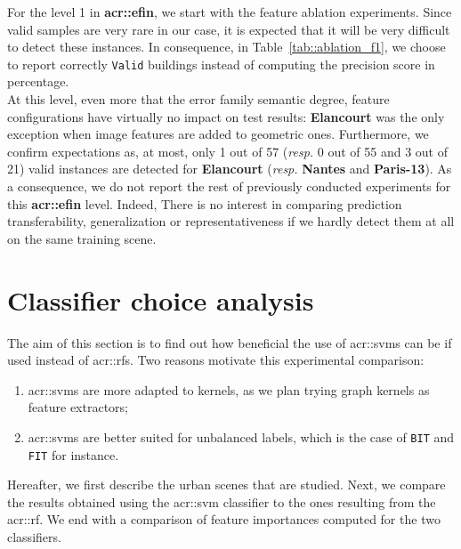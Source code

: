         For the level 1 in \textbf{\gls{acr::efin}}, we start with the feature ablation experiments.
        Since valid samples are very rare in our case, it is expected that it will be very difficult to detect these instances.
        In consequence, in Table~\ref{tab::ablation_f1}, we choose to report correctly \texttt{Valid} buildings instead of computing the precision score in percentage.\\
            
        At this level, even more that the error family semantic degree, feature configurations have virtually no impact on test results: \textbf{Elancourt} was the only exception when image features are added to geometric ones.
        Furthermore, we confirm expectations as, at most, only 1 out of 57 (\textit{resp.} 0 out of 55 and 3 out of 21) valid instances are detected for \textbf{Elancourt} (\textit{resp.} \textbf{Nantes} and \textbf{Paris-13}).
        As a consequence, we do not report the rest of previously conducted experiments for this \textbf{\gls{acr::efin}} level.
        Indeed, There is no interest in comparing prediction transferability, generalization or representativeness if we hardly detect them at all on the same training scene.

\section{Classifier choice analysis}
    \label{sec::more_experiments::classifier}
    The aim of this section is to find out how beneficial the use of \glspl{acr::svm} can be if used instead of \glspl{acr::rf}.
    Two reasons motivate this experimental comparison:
    \begin{enumerate}[label=\roman*)]
        \item \glspl{acr::svm} are more adapted to kernels, as we plan trying graph kernels as feature extractors;
        \item \glspl{acr::svm} are better suited for unbalanced labels, which is the case of \texttt{BIT} and \texttt{FIT} for instance.
    \end{enumerate}
    Hereafter, we first describe the urban scenes that are studied.
    Next, we compare the results obtained using the \gls{acr::svm} classifier to the ones resulting from the \gls{acr::rf}.
    We end with a comparison of feature importances computed for the two classifiers.

